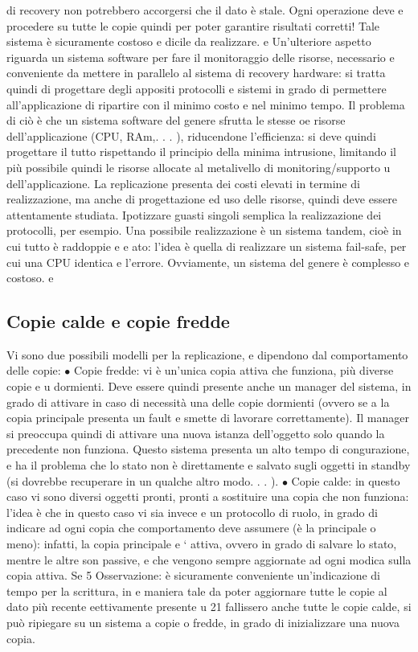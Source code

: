 \documentclass[a4paper,12pt]{article}
\begin{document}
di recovery non potrebbero accorgersi che il dato è stale. Ogni operazione deve
e
procedere su tutte le copie quindi per poter garantire risultati corretti! Tale
sistema è sicuramente costoso e dicile da realizzare.
e
Un'ulteriore aspetto riguarda un sistema software per fare il monitoraggio
delle risorse, necessario e conveniente da mettere in parallelo al sistema di recovery hardware: si tratta quindi di
progettare degli appositi protocolli e sistemi in
grado di permettere all'applicazione di ripartire con il minimo costo e nel minimo
tempo. Il problema di ciò è che un sistema software del genere sfrutta le stesse
oe
risorse dell'applicazione (CPU, RAm,. . . ), riducendone l'efficienza: si deve quindi progettare il tutto rispettando il
principio della minima intrusione, limitando
il più possibile quindi le risorse allocate al metalivello di monitoring/supporto
u
dell'applicazione. La replicazione presenta dei costi elevati in termine di realizzazione, ma anche di progettazione ed
uso delle risorse, quindi deve essere
attentamente studiata. Ipotizzare guasti singoli semplica la realizzazione dei
protocolli, per esempio.
Una possibile realizzazione è un sistema tandem, cioè in cui tutto è raddoppie
e
e
ato: l'idea è quella di realizzare un sistema fail-safe, per cui una CPU identica
e
l'errore. Ovviamente, un sistema del genere è complesso e costoso.
e
\subsection{Copie calde e copie fredde}
Vi sono due possibili modelli per la replicazione, e dipendono dal comportamento
delle copie:
$\bullet$ Copie fredde: vi è un'unica copia attiva che funziona, più diverse copie
e
u
dormienti. Deve essere quindi presente anche un manager del sistema, in
grado di attivare in caso di necessità una delle copie dormienti (ovvero se
a
la copia principale presenta un fault e smette di lavorare correttamente).
Il manager si preoccupa quindi di attivare una nuova istanza dell'oggetto
solo quando la precedente non funziona. Questo sistema presenta un alto
tempo di congurazione, e ha il problema che lo stato non è direttamente
e
salvato sugli oggetti in standby (si dovrebbe recuperare in un qualche altro
modo. . . ).
$\bullet$ Copie calde: in questo caso vi sono diversi oggetti pronti, pronti a sostituire una copia che non funziona:
l'idea è che in questo caso vi sia invece
e
un protocollo di ruolo, in grado di indicare ad ogni copia che comportamento deve assumere (è la principale o meno):
infatti, la copia principale
e
` attiva, ovvero in grado di salvare lo stato, mentre le altre son passive,
e
che vengono sempre aggiornate ad ogni modica sulla copia attiva. Se
5 Osservazione: è sicuramente conveniente un'indicazione di tempo per la scrittura, in
e
maniera tale da poter aggiornare tutte le copie al dato più recente eettivamente presente
u
21
fallissero anche tutte le copie calde, si può ripiegare su un sistema a copie
o
fredde, in grado di inizializzare una nuova copia.
\end{document}
